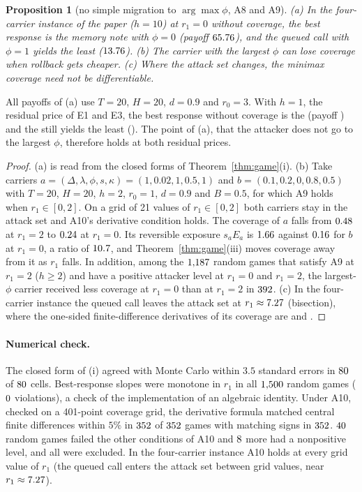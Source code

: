\documentclass[11pt]{article}
\newtheorem{proposition}[theorem]{Proposition}
\theoremstyle{definition}
\begin{document}
\begin{proposition}[no simple migration to $\arg\max\phi$, A8 and A9]\label{prop:p3}
(a) In the four-carrier instance of the paper ($h=10$) at $r_1=0$ without coverage, the best response is the
memory note with $\phi=0$ (payoff $65.76$), and the queued call with $\phi=1$ yields the least
($13.76$). (b) The carrier with the largest $\phi$ can lose coverage when rollback gets cheaper.
(c) Where the attack set changes, the minimax coverage need not be differentiable.
\end{proposition}
All payoffs of (a) use $T=20$, $H=20$, $d=0.9$ and $r_0=3$. With $h=1$, the residual price of E1 and E3,
the best response without coverage is the \PThreeLowHbr{} (payoff \PThreeLowHbrU) and the
\PThreeLowHleast{} still yields the least (\PThreeLowHleastU). The point of (a), that the attacker does not
go to the largest $\phi$, therefore holds at both residual prices.
\begin{proof}
(a) is read from the closed forms of Theorem~\ref{thm:game}(i). (b) Take carriers
$a=(\Delta,\lambda,\phi,s,\kappa)=(1,0.02,1,0.5,1)$ and $b=(0.1,0.2,0,0.8,0.5)$ with $T=20$, $H=20$, $h=2$,
$r_0=1$, $d=0.9$ and $B=0.5$, for which A9 holds when $r_1\in[0,2]$. On a grid of 21 values of $r_1\in[0,2]$ both
carriers stay in the attack set and A10's derivative condition holds. The coverage of $a$ falls from
$0.48$ at $r_1=2$ to $0.24$ at $r_1=0$. Its reversible exposure $s_aE_a$ is
$1.66$ against $0.16$ for $b$ at $r_1=0$, a ratio of $10.7$, and
Theorem~\ref{thm:game}(iii) moves coverage away from it as $r_1$ falls. In addition, among the
$1{,}187$ random games that satisfy A9 at $r_1=2$ ($h\ge2$) and have a positive attacker level at
$r_1=0$ and $r_1=2$, the largest-$\phi$ carrier received less coverage at $r_1=0$ than at $r_1=2$ in
$392$. (c) In the four-carrier instance the
queued call leaves the attack set at $r_1\approx7.27$ (bisection), where the one-sided
finite-difference derivatives of its coverage are \PThreeKinkLeft{} and \PThreeKinkRight.
\end{proof}

\paragraph{Numerical check.} The closed form of (i) agreed with Monte Carlo within $3.5$ standard errors in
$80$ of $80$ cells. Best-response slopes were monotone in $r_1$ in all $1{,}500$ random
games ($0$ violations), a check of the implementation of an algebraic identity. Under
A10, checked on a 401-point coverage grid, the derivative formula matched central finite differences within
$5\%$ in $352$ of $352$ games with matching signs in $352$. $40$ random games
failed the other conditions of A10 and $8$ more had a nonpositive level, and all were excluded.
In the four-carrier instance A10 holds at every grid value of $r_1$ (the queued call enters the attack set
between grid values, near $r_1\approx7.27$).
\end{document}
